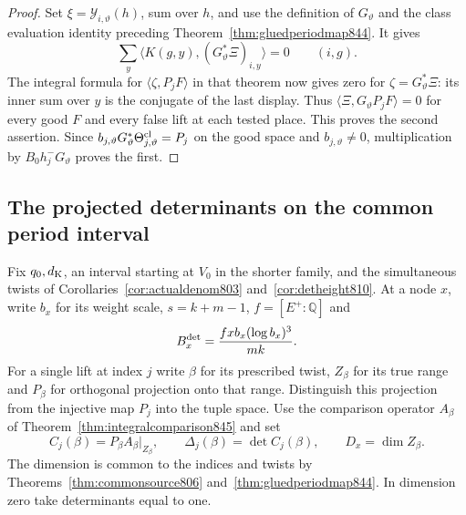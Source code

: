 \documentclass[a4paper,11pt]{article}
\theoremstyle{definition}
\theoremstyle{remark}
\numberwithin{equation}{section}
\begin{document}
\begin{proof}
Set \(\xi=\mathcal Y_{i,\vartheta}(h)\), sum over \(h\), and
use the definition of \(G_\vartheta\) and the class evaluation
identity preceding Theorem~\ref{thm:gluedperiodmap844}. It gives
\[
          \sum_y\langle K(g,y),(G_\vartheta^*\Xi)_{i,y}\rangle=0
                             \qquad(i,g).
\]
The integral formula for \(\langle\zeta,P_jF\rangle\) in that
theorem now gives zero for \(\zeta=G_\vartheta^*\Xi\): its inner
sum over \(y\) is the conjugate of the last display. Thus
\(\langle\Xi,G_\vartheta P_j F\rangle=0\) for every good \(F\)
and every false lift at each tested place. This proves the
second assertion. Since
\(b_{j,\vartheta}G_\vartheta^*\Theta_{j,\vartheta}^{\rm cl}
  =P_j\) on the good space and \(b_{j,\vartheta}\ne0\),
multiplication by \(B_0h_j^-G_\vartheta\) proves the first.
\end{proof}
\clearpage

\subsection{The projected determinants on the common period interval}
\label{sec:compressionbudget851}
Fix \(q_0,d_{\rm K}\), an interval starting at \(V_0\) in the
shorter family, and the simultaneous twists of
Corollaries~\ref{cor:actualdenom803} and~\ref{cor:detheight810}.
At a node \(x\), write \(b_x\) for its weight scale, \(s=k+m-1\),
\(f=[E^+:\mathbb Q]\) and
\[
        B_x^{\rm det}=\frac{fxb_x(\log b_x)^3}{mk}.
\]
For a single lift at index \(j\) write \(\beta\) for its prescribed
twist, \(Z_\beta\) for its true range and \(P_\beta\) for orthogonal
projection onto that range. Distinguish this projection from
the injective map \(P_j\) into the tuple space. Use the comparison
operator \(A_\beta\) of Theorem~\ref{thm:integralcomparison845}
and set
\[
 C_j(\beta)=P_\beta A_\beta|_{Z_\beta},\qquad
 \Delta_j(\beta)=\det C_j(\beta),\qquad
 D_x=\dim Z_\beta .
\]
The dimension is common to the indices and twists by
Theorems~\ref{thm:commonsource806} and~\ref{thm:gluedperiodmap844}.
In dimension zero take determinants equal to one.
\end{document}
